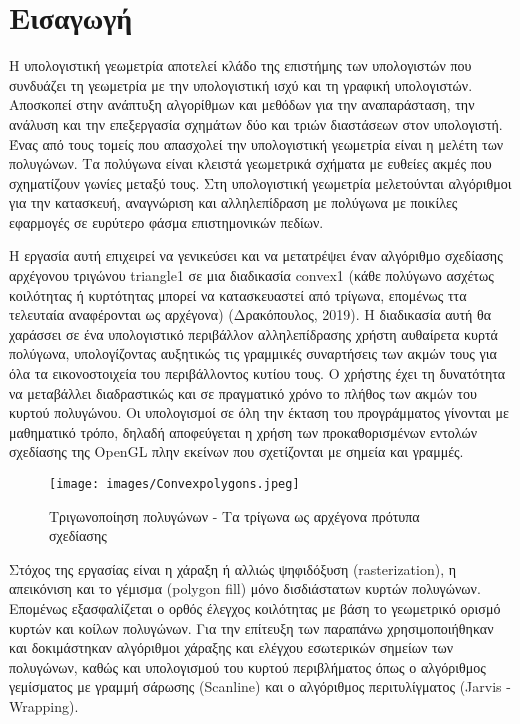 \chapter*{Εισαγωγή}
\par
Η υπολογιστική γεωμετρία αποτελεί κλάδο της επιστήμης των υπολογιστών που συνδυάζει τη γεωμετρία με την υπολογιστική ισχύ και τη γραφική υπολογιστών. Αποσκοπεί στην ανάπτυξη αλγορίθμων και μεθόδων για την αναπαράσταση, την ανάλυση και την επεξεργασία σχημάτων δύο και τριών διαστάσεων στον υπολογιστή. Ένας από τους τομείς που απασχολεί την υπολογιστική γεωμετρία είναι η μελέτη των πολυγώνων. Τα πολύγωνα είναι κλειστά γεωμετρικά σχήματα με ευθείες ακμές που σχηματίζουν γωνίες μεταξύ τους. Στη υπολογιστική γεωμετρία μελετούνται αλγόριθμοι για την κατασκευή, αναγνώριση και αλληλεπίδραση με πολύγωνα με ποικίλες εφαρμογές σε ευρύτερο φάσμα επιστημονικών πεδίων. 
\par
Η εργασία αυτή επιχειρεί να γενικεύσει και να μετατρέψει έναν αλγόριθμο σχεδίασης αρχέγονου τριγώνου \textlatin{triangle1} σε μια διαδικασία  \textlatin{convex1} (κάθε πολύγωνο ασχέτως κοιλότητας ή κυρτότητας μπορεί να κατασκευαστεί από τρίγωνα, επομένως ττα τελευταία αναφέρονται ως αρχέγονα) (Δρακόπουλος, 2019). Η διαδικασία αυτή θα χαράσσει σε ένα υπολογιστικό περιβάλλον αλληλεπίδρασης χρήστη αυθαίρετα κυρτά πολύγωνα, υπολογίζοντας αυξητικώς τις γραμμικές συναρτήσεις των ακμών τους για όλα τα εικονοστοιχεία του περιβάλλοντος κυτίου τους. Ο χρήστης έχει τη δυνατότητα να μεταβάλλει διαδραστικώς και σε πραγματικό χρόνο το πλήθος των ακμών του κυρτού πολυγώνου. Οι υπολογισμοί σε όλη την έκταση του προγράμματος γίνονται με μαθηματικό τρόπο, δηλαδή αποφεύγεται η χρήση των προκαθορισμένων εντολών σχεδίασης της \textlatin{OpenGL} πλην εκείνων που σχετίζονται με σημεία και γραμμές. 

\begin{figure}[h]
\centering
\texttt{[image: images/Convexpolygons.jpeg]}
\caption{Τριγωνοποίηση πολυγώνων - Τα τρίγωνα ως αρχέγονα πρότυπα σχεδίασης}
\end{figure}
\par
Στόχος της εργασίας είναι η χάραξη ή αλλιώς ψηφιδόξυση \textlatin{(rasterization)}, η απεικόνιση και το γέμισμα \textlatin{(polygon fill)} μόνο δισδιάστατων κυρτών πολυγώνων. Επομένως εξασφαλίζεται ο ορθός έλεγχος κοιλότητας με βάση το γεωμετρικό ορισμό κυρτών και κοίλων πολυγώνων. Για την επίτευξη των παραπάνω χρησιμοποιήθηκαν και δοκιμάστηκαν αλγόριθμοι χάραξης και ελέγχου εσωτερικών σημείων των πολυγώνων, καθώς και υπολογισμού του κυρτού περιβλήματος όπως ο αλγόριθμος γεμίσματος με γραμμή σάρωσης \textlatin{(Scanline)} και ο αλγόριθμος περιτυλίγματος \textlatin{(Jarvis - Wrapping)}.  
\par

